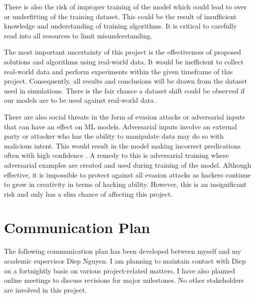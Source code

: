 \documentclass[a4paper,12pt]{report}
\begin{document}
There is also the risk of improper training of the model which could lead to over or underfitting of the training dataset. 
This could be the result of insufficient knowledge and understanding of training algorithms. 
It is critical to carefully read into all resources to limit misunderstanding. 

The most important uncertainty of this project is the effectiveness of proposed solutions and algorithms using real-world data. 
It would be inefficient to collect real-world data and perform experiments within the given timeframe of this project. 
Consequently, all results and conclusions will be drawn from the dataset used in simulations. 
There is the fair chance a dataset shift could be observed if our models are to be used against real-world data \cite{gupta}.

There are also social threats in the form of evasion attacks or adversarial inputs that can have an effect on ML models. 
Adversarial inputs involve an external party or attacker who has the ability to manipulate data may do so with malicious intent. 
This would result in the model making incorrect predications often with high confidence \cite{gupta}. 
A remedy to this is adversarial training where adversarial examples are created and used during training of the model. 
Although effective, it is impossible to protect against all evasion attacks as hackers continue to grow in creativity in terms of hacking ability. 
However, this is an insignificant risk and only has a slim chance of affecting this project.

\newpage
\section{Communication Plan}
The following communication plan has been developed between myself and my academic supervisor Diep Nguyen. 
I am planning to maintain contact with Diep on a fortnightly basis on various project-related matters.
I have also planned online meetings to discuss revisions for major milestones. No other stakeholders are involved in this project.
\end{document}
